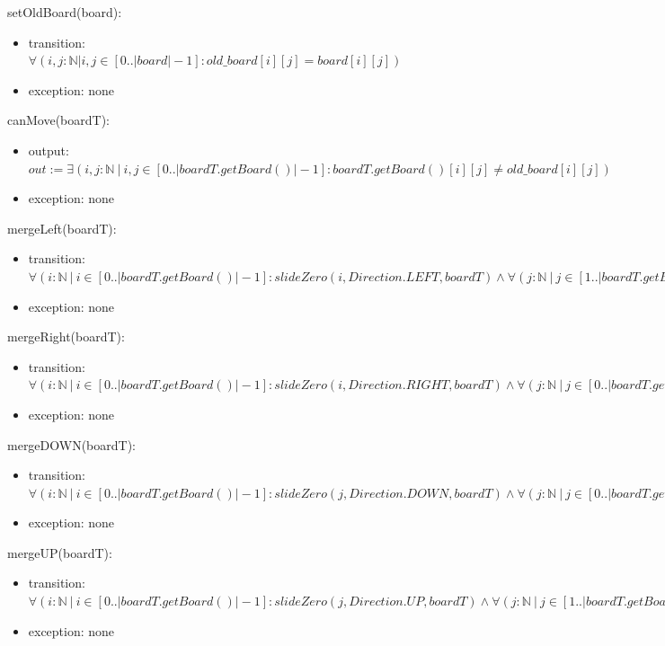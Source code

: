 \documentclass[12pt]{article}
\begin{document}
\noindent setOldBoard(board):
\begin{itemize}
\item transition: $\forall(i,j : \mathbb{N} | i,j \in [0..|board|-1] : old\_board[i][j] = board[i][j])$
\item exception: none
\end{itemize}

\noindent canMove(boardT):
\begin{itemize}
\item output: $out := \exists(i, j : \mathbb{N}\ |\ i, j \in [0..|boardT.getBoard()|-1] : boardT.getBoard()[i][j] \neq old\_board[i][j])$
\item exception: none
\end{itemize}

\noindent mergeLeft(boardT):
\begin{itemize}
\item transition: $\forall(i : \mathbb{N}\ |\ i \in [0..|boardT.getBoard()|-1] : slideZero(i, Direction.LEFT, boardT) \land \forall(j : \mathbb{N}\ |\ j \in [1..|boardT.getBoard()|-1] : combine(i,j, Direction.LEFT, boardT)) \land slideZero(i, Direction.LEFT, boardT))$
\item exception: none
\end{itemize}

\noindent mergeRight(boardT):
\begin{itemize}
\item transition: $\forall(i : \mathbb{N}\ |\ i \in [0..|boardT.getBoard()|-1] : slideZero(i, Direction.RIGHT, boardT) \land \forall(j : \mathbb{N}\ |\ j \in [0..|boardT.getBoard()|-2] : combine(i,j, Direction.RIGHT, boardT)) \land slideZero(i, Direction.RIGHT, boardT))$
\item exception: none
\end{itemize}

\noindent mergeDOWN(boardT):
\begin{itemize}
\item transition: $\forall(i : \mathbb{N}\ |\ i \in [0..|boardT.getBoard()|-1] : slideZero(j, Direction.DOWN, boardT) \land \forall(j : \mathbb{N}\ |\ j \in [0..|boardT.getBoard()|-2] : combine(j,i, Direction.DOWN, boardT)) \land slideZero(j, Direction.DOWN, boardT))$
\item exception: none
\end{itemize}


\noindent mergeUP(boardT):
\begin{itemize}
\item transition: $\forall(i : \mathbb{N}\ |\ i \in [0..|boardT.getBoard()|-1] : slideZero(j, Direction.UP, boardT) \land \forall(j : \mathbb{N}\ |\ j \in [1..|boardT.getBoard()|-1] : combine(j,i, Direction.UP, boardT)) \land slideZero(j, Direction.UP, boardT))$
\item exception: none
\end{itemize}
\end{document}
